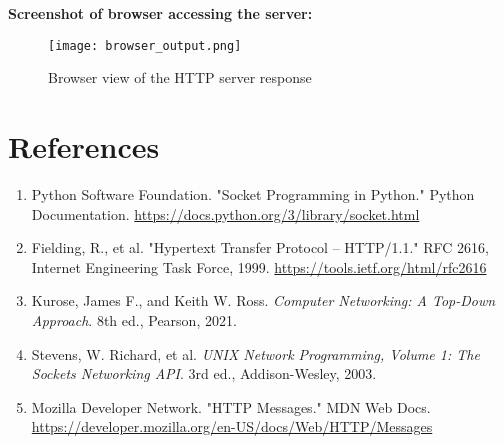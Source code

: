 \documentclass[12pt]{article}
\begin{document}
\textbf{Screenshot of browser accessing the server:}

\begin{figure}[H]
    \centering
    \texttt{[image: browser\_output.png]}
    \caption{Browser view of the HTTP server response}
    \label{fig:server_browser}
\end{figure}

\section{References}

\begin{enumerate}
    \item Python Software Foundation. "Socket Programming in Python." Python Documentation. \url{https://docs.python.org/3/library/socket.html}
    \item Fielding, R., et al. "Hypertext Transfer Protocol -- HTTP/1.1." RFC 2616, Internet Engineering Task Force, 1999. \url{https://tools.ietf.org/html/rfc2616}
    \item Kurose, James F., and Keith W. Ross. \textit{Computer Networking: A Top-Down Approach}. 8th ed., Pearson, 2021.
    \item Stevens, W. Richard, et al. \textit{UNIX Network Programming, Volume 1: The Sockets Networking API}. 3rd ed., Addison-Wesley, 2003.
    \item Mozilla Developer Network. "HTTP Messages." MDN Web Docs. \url{https://developer.mozilla.org/en-US/docs/Web/HTTP/Messages}
\end{enumerate}
\end{document}

